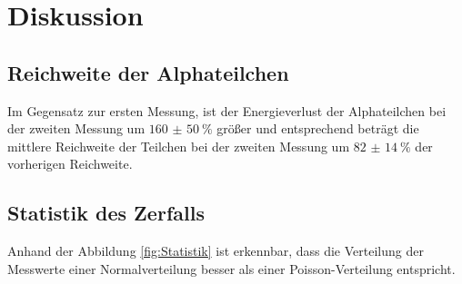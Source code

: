 \section{Diskussion}
\label{sec:Diskussion}
\subsection{Reichweite der Alphateilchen}

Im Gegensatz zur ersten Messung, ist der Energieverlust der Alphateilchen bei der zweiten Messung um $\qty{160(50)}{\percent}$
größer und entsprechend beträgt die mittlere Reichweite der Teilchen bei der zweiten Messung um $\qty{82(14)}{\percent}$
der vorherigen Reichweite.

\subsection{Statistik des Zerfalls}
Anhand der Abbildung \ref{fig:Statistik} ist erkennbar, dass die Verteilung der Messwerte einer Normalverteilung besser als einer Poisson-Verteilung entspricht. 